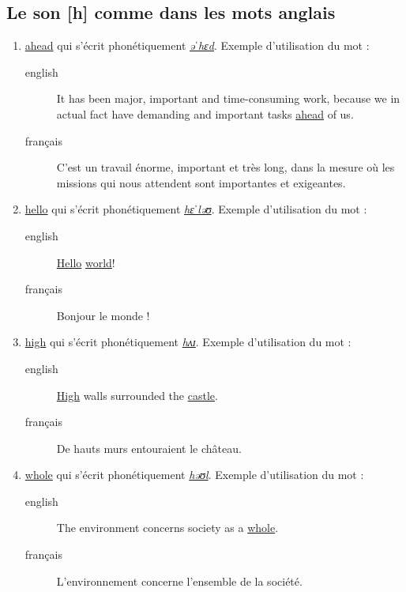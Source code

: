 \subsection{Le son [h] comme dans les mots anglais}
\label{sec:orga471592}
\begin{enumerate}
\item \href{http://www.wordreference.com/enfr/ahead}{ahead} qui s'écrit phonétiquement \href{https://en.oxforddictionaries.com/definition/ahead}{\emph{əˈhɛd}}. Exemple d'utilisation du mot : 
\begin{description}
\item[{english}] \textenglish{It has been major, important and time-consuming work,
because we in actual fact have demanding and important tasks
\href{https://youtu.be/1rLpIOzKaBA}{ahead} of us.}
\item[{français}] C'est un travail énorme, important et très long, dans
la mesure où les missions qui nous attendent sont importantes
et exigeantes.
\end{description}
\item \href{http://www.wordreference.com/enfr/hello}{hello} qui s'écrit phonétiquement \href{https://en.oxforddictionaries.com/definition/hello}{\emph{hɛˈləʊ}}. Exemple d'utilisation du mot :
\begin{description}
\item[{english}] \textenglish{\href{https://youtu.be/62XB9IbMnxQ}{Hello} \href{https://en.wikipedia.org/wiki/\%2522Hello,\_World!\%2522\_program}{world}!}
\item[{français}] Bonjour le monde !
\end{description}
\item \href{http://www.wordreference.com/enfr/high}{high} qui s'écrit phonétiquement \href{https://en.oxforddictionaries.com/definition/high}{\emph{hʌɪ}}. Exemple d'utilisation du mot :
\begin{description}
\item[{english}] \textenglish{\href{https://youtu.be/F7lj4LknWO8}{High} walls surrounded the \href{https://youtu.be/hclQLklBHNs}{castle}.}
\item[{français}] De hauts murs entouraient le château.
\end{description}
\item \href{http://www.wordreference.com/enfr/whole}{whole} qui s'écrit phonétiquement \href{https://en.oxforddictionaries.com/definition/whole}{\emph{həʊl}}. Exemple d'utilisation du mot :
\begin{description}
\item[{english}] \textenglish{The environment concerns society as a \href{https://youtu.be/bJnw1ma6Xks}{whole}.}
\item[{français}] L'environnement concerne l'ensemble de la société.
\end{description}
\end{enumerate}
